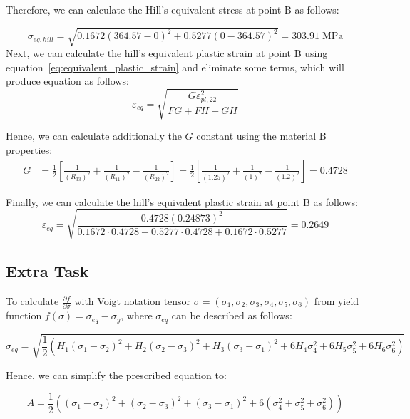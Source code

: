 \documentclass[12pt]{article}
\begin{document}
Therefore, we can calculate the Hill's equivalent stress at point B as follows:

\begin{equation}
    \sigma_{eq, hill} = \sqrt{0.1672(364.57-0)^2 + 0.5277(0-364.57)^2} = 303.91 \;\text{MPa}
\end{equation} 
Next, we can calculate the hill's equivalent plastic strain at point B using equation~\ref{eq:equivalent_plastic_strain}
and eliminate some terms, which will produce equation as follows:
\begin{equation}
    \varepsilon_{eq} = \sqrt{\frac{ G\varepsilon_{pl,22}^2}{FG+FH+GH}}
\end{equation}

Hence, we can calculate additionally the $G$ constant using the material B properties:
\begin{align*}
G &= \frac{1}{2} \left[ \frac{1}{(R_{33})^2} + \frac{1}{(R_{11})^2} - \frac{1}{(R_{22})^2} \right] = \frac{1}{2} \left[ \frac{1}{(1.25)^2} + \frac{1}{(1)^2} - \frac{1}{(1.2)^2} \right] = 0.4728
\end{align*}

Finally, we can calculate the hill's equivalent plastic strain at point B as follows:
\begin{equation}
    \varepsilon_{eq} = \sqrt{\frac{0.4728(0.24873)^2}{0.1672 \cdot 0.4728 + 0.5277 \cdot 0.4728 + 0.1672 \cdot 0.5277}} = 0.2649
\end{equation}
\subsection*{Extra Task}
To calculate $\frac{\partial{f}}{\partial{\sigma}}$ with Voigt notation tensor $\sigma = (\sigma_1, \sigma_2, \sigma_3, \sigma_4, \sigma_5, \sigma_6)$ from yield function 
$f(\sigma)=\sigma_{eq} - \sigma_y$, where $\sigma_{eq}$ can be described as follows:

\begin{equation}
    \sigma_{eq} = \sqrt{\frac{1}{2} \left( H_{1}(\sigma_1 - \sigma_2)^2 + H_{2}(\sigma_2 - \sigma_3)^2 + H_{3}(\sigma_3 - \sigma_1)^2 + 6H_{4}\sigma_4^2 + 6H_{5}\sigma_5^2 + 6H_{6}\sigma_6^2 \right)}
\end{equation}

Hence, we can simplify the prescribed equation to:

\begin{equation}
A = \frac{1}{2} \left( (\sigma_1 - \sigma_2)^2 + (\sigma_2 - \sigma_3)^2 + (\sigma_3 - \sigma_1)^2 + 6(\sigma_4^2 + \sigma_5^2 + \sigma_6^2) \right)
\end{equation}
\end{document}
